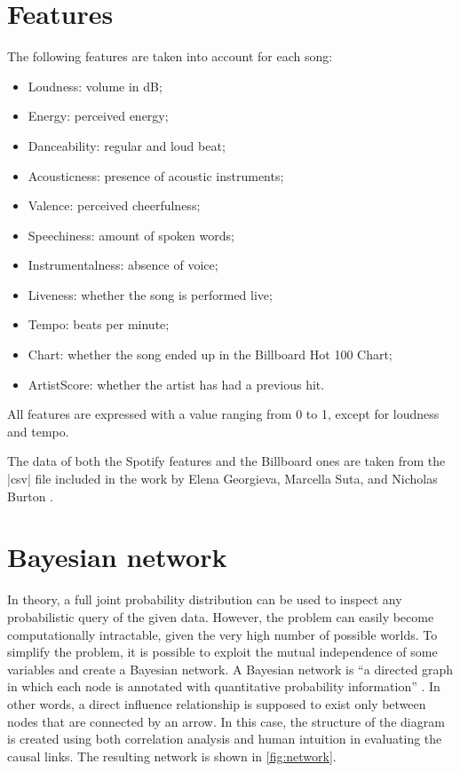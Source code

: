 \documentclass[a4paper, 12pt]{article}
\begin{document}
\section{Features}

The following features are taken into account for each song:
\begin{itemize}
    \item Loudness: volume in dB;
    \item Energy: perceived energy;
    \item Danceability: regular and loud beat;
    \item Acousticness: presence of acoustic instruments;
    \item Valence: perceived cheerfulness;
    \item Speechiness: amount of spoken words;
    \item Instrumentalness: absence of voice;
    \item Liveness: whether the song is performed live;
    \item Tempo: beats per minute;
    \item Chart: whether the song ended up in the Billboard Hot 100 Chart;
    \item ArtistScore: whether the artist has had a previous hit.
\end{itemize}

All features are expressed with a value ranging from 0 to 1, except for loudness and tempo.

The data of both the Spotify features and the Billboard ones are taken from the \spverb|csv| file included in the work by Elena Georgieva, Marcella Suta, and Nicholas Burton \cite{hitpredict-presentation, hitpredict-report}.


\section{Bayesian network}

In theory, a full joint probability distribution can be used to inspect any probabilistic query of the given data. However, the problem can easily become computationally intractable, given the very high number of possible worlds. To simplify the problem, it is possible to exploit the mutual independence of some variables and create a Bayesian network. A Bayesian network is ``a directed graph in which each node is annotated with quantitative probability information'' \cite{probabilistic-reasoning}. In other words, a direct influence relationship is supposed to exist only between nodes that are connected by an arrow. In this case, the structure of the diagram is created using both correlation analysis and human intuition in evaluating the causal links. The resulting network is shown in \cref{fig:network}.
\end{document}
